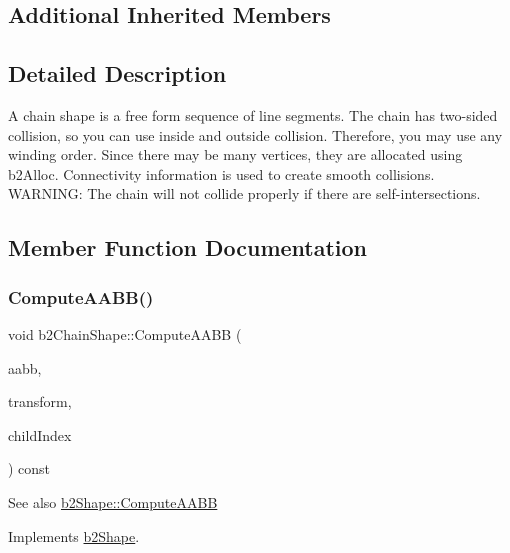\subsection*{Additional Inherited Members}


\subsection{Detailed Description}
A chain shape is a free form sequence of line segments. The chain has two-\/sided collision, so you can use inside and outside collision. Therefore, you may use any winding order. Since there may be many vertices, they are allocated using b2\+Alloc. Connectivity information is used to create smooth collisions. W\+A\+R\+N\+I\+NG\+: The chain will not collide properly if there are self-\/intersections. 

\subsection{Member Function Documentation}
\mbox{\label{classb2ChainShape_a612caee9cc6a62dec501a6b6059c13a8}} 
\subsubsection{\texorpdfstring{Compute\+A\+A\+B\+B()}{ComputeAABB()}\hspace{0.1cm}{\footnotesize\ttfamily [1/2]}}
{\footnotesize\ttfamily void b2\+Chain\+Shape\+::\+Compute\+A\+A\+BB (\begin{DoxyParamCaption}\item[{\hyperlink{structb2AABB}{b2\+A\+A\+BB} $\ast$}]{aabb,  }\item[{const \hyperlink{structb2Transform}{b2\+Transform} \&}]{transform,  }\item[{int32}]{child\+Index }\end{DoxyParamCaption}) const\hspace{0.3cm}{\ttfamily [virtual]}}

\begin{DoxySeeAlso}{See also}
\hyperlink{classb2Shape_a88e9807fab0c8ca9a98d8926e50a1411}{b2\+Shape\+::\+Compute\+A\+A\+BB} 
\end{DoxySeeAlso}


Implements \hyperlink{classb2Shape_a88e9807fab0c8ca9a98d8926e50a1411}{b2\+Shape}.

